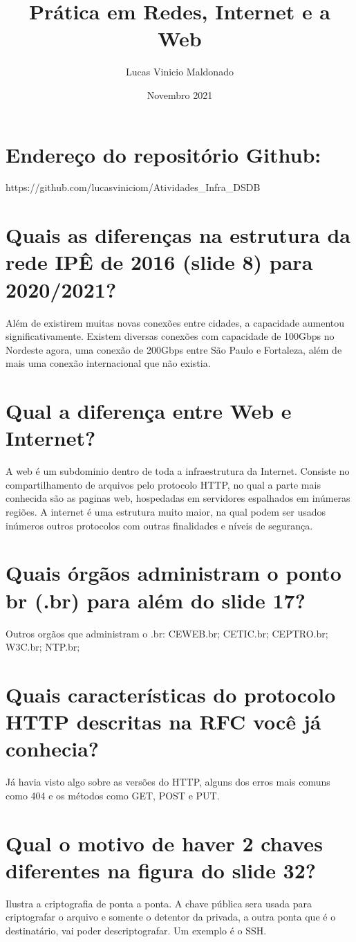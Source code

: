 \documentclass{article}
\title{Prática em Redes, Internet e a Web}
\author{Lucas Vinicio Maldonado}
\date{Novembro 2021}
\begin{document}
\maketitle

\section{Endereço do repositório Github:}
https://github.com/lucasviniciom/Atividades_Infra_DSDB

\section{Quais as diferenças na estrutura da rede IPÊ de 2016 (slide 8) para 2020/2021?}
Além de existirem muitas novas conexões entre cidades, a capacidade aumentou significativamente. Existem diversas conexões com capacidade de 100Gbps no Nordeste agora, uma conexão de 200Gbps entre São Paulo e Fortaleza, além de mais uma conexão internacional que não existia.

\section{Qual a diferença entre Web e Internet?}
A web é um subdominio dentro de toda a infraestrutura da Internet. Consiste no compartilhamento de arquivos pelo protocolo HTTP, no qual a parte mais conhecida são as paginas web, hospedadas em servidores espalhados em inúmeras regiões.
A internet é uma estrutura muito maior, na qual podem ser usados inúmeros outros protocolos com outras finalidades e níveis de segurança.

\section{Quais órgãos administram o ponto br (.br) para além do slide 17?}
Outros orgãos que administram o .br:
CEWEB.br; CETIC.br; CEPTRO.br; W3C.br; NTP.br;


\section{Quais características do protocolo HTTP descritas na RFC você já conhecia?}
Já havia visto algo sobre as versões do HTTP, alguns dos erros mais comuns como 404 e os métodos como GET, POST e PUT.


\section{Qual o motivo de haver 2 chaves diferentes na figura do slide 32?}

Ilustra a criptografia de ponta a ponta. A chave pública sera usada para criptografar o arquivo e somente o detentor da privada, a outra ponta que é o destinatário, vai poder descriptografar. Um exemplo é o SSH.
\end{document}
